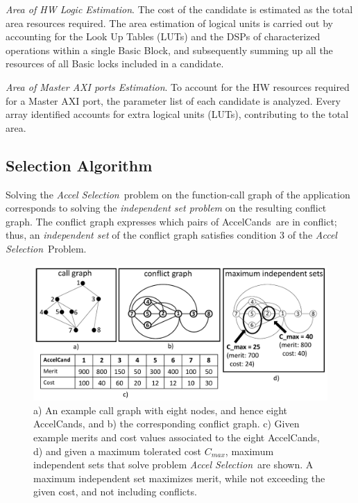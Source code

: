 \documentclass[]{usiinfthesis}
\newcommand{\candidates}{{AccelCand}s}
\newcommand{\asprobname}{\emph{Accel Selection}}
\begin{document}
\emph{Area of HW Logic Estimation}. The cost of the candidate is
estimated as the total area resources required. The area estimation
of logical units is carried out by accounting for the Look Up Tables
(LUTs) and the DSPs of characterized operations within a single Basic
Block, and subsequently summing up all the resources of all Basic
locks included in a candidate.\par

\emph{Area of Master AXI ports Estimation}. To account for the HW
resources required for a Master AXI port, the parameter list of each
candidate is analyzed. Every array identified accounts for extra
logical units (LUTs), contributing to the total area.

\subsection{Selection Algorithm}
\label{sec:algo}

Solving the \asprobname\ problem on the function-call graph of the
application corresponds to solving the \emph{independent set problem} on 
the resulting conflict graph. The conflict graph expresses which pairs of 
\candidates\ are in conflict; thus, an \emph{independent set} of the conflict 
graph satisfies condition $3$ of the \asprobname\ Problem.\par

\begin{figure}[!t]
  \centering
  \includegraphics[width=0.8\linewidth]{figs/max_set_examples.pdf}
  \caption{a) An example call graph with eight nodes, and hence
          eight \candidates, and b) the corresponding conflict graph.
          c) Given example merits and cost values associated to the eight
          \candidates, d) and given a maximum tolerated cost
          $C_{max}$, maximum independent sets that solve problem
          \asprobname\ are shown. A maximum independent set maximizes
          merit, while not exceeding the given cost, and not including
          conflicts.}
  \label{fig:max-set-examples}
\end{figure}
\end{document}
